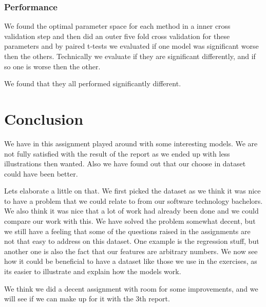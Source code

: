 \subsection{Performance} 
We found the optimal parameter space for each method in a inner cross validation step and then did an outer five fold cross validation for these parameters and by paired t-tests we evaluated if one model was significant worse then the others. Technically we evaluate if they are significant differently, and if so one is worse then the other.

We found that they all performed significantly different.



\chapter{Conclusion}

We have in this assignment played around with some interesting models. We are not fully satisfied with the result of the report as we ended up with less illustrations then wanted. Also we have found out that our choose in dataset could have been better. 

Lets elaborate a little on that. We first picked the dataset as we think it was nice to have a problem that we could relate to from our software technology bachelors. We also think it was nice that a lot of work had already been done and we could compare our work with this. We have solved the problem somewhat decent, but we still have a feeling that some of the questions raised in the assignments are not that easy to address on this dataset. One example is the regression stuff, but another one is also the fact that our features are arbitrary numbers. We now see how it could be beneficial to have a dataset like those we use in the exercises, as its easier to illustrate and explain how the models work.

We think we did a decent assignment with room for some improvements, and we will see if we can make up for it with the 3th report. 

